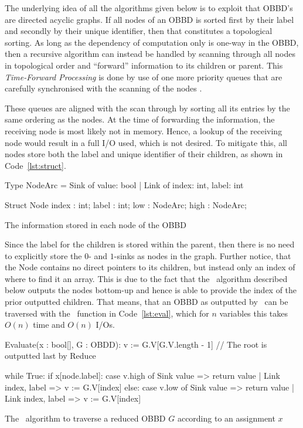 The underlying idea of all the algorithms given below is to exploit that OBBD's
are directed acyclic graphs. If all nodes of an OBBD is sorted first by their
label and secondly by their unique identifier, then that constitutes a
topological sorting. As long as the dependency of computation only is one-way in
the OBBD, then a recursive algorithm can instead be handled by scanning through
all nodes in topological order and ``forward'' information to its children or
parent. This \emph{Time-Forward Processing} is done by use of one more priority
queues that are carefully synchronised with the scanning of the nodes \todocite.

These queues are aligned with the scan through by sorting all its entries by the
same ordering as the nodes. At the time of forwarding the information, the
receiving node is most likely not in memory. Hence, a lookup of the receiving
node would result in a full I/O used, which is not desired. To mitigate this,
all nodes store both the label and unique identifier of their children, as shown
in Code~\ref{lst:struct}.
\begin{lstfloat}[ht!]
  \centering

  \begin{blstlisting}[language=pseudo, numbers=none]
  Type NodeArc = Sink of { value: bool }
               | Link of { index: int, label: int }

  Struct Node {
    index : int;
    label : int;
    low   : NodeArc;
    high  : NodeArc;
  }
  \end{blstlisting}

  \caption{The information stored in each node of the OBBD}
  \label{lst:struct}
\end{lstfloat}

Since the label for the children is stored within the parent, then there is no
need to explicitly store the $0$- and $1$-sinks as nodes in the graph. Further
notice, that the Node contains no direct pointers to its children, but instead
only an index of where to find it an array. This is due to the fact that the
\Reduce\ algorithm described below outputs the nodes bottom-up and hence is able
to provide the index of the prior outputted children. That means, that an OBBD
as outputted by \Reduce\ can be traversed with the \Evaluate\ function in
Code~\ref{lst:eval}, which for $n$ variables this takes $O(n)$ time and $O(n)$
I/Os.
\begin{lstfloat}[ht!]
  \centering

  \begin{blstlisting}
  Evaluate(x : bool[], G : OBDD):
    v := G.V[G.V.length - 1] // The root is outputted last by Reduce

    while True:
      if x[node.label]:
        case v.high of Sink{ value }        => return value
                     | Link{ index, label } => v := G.V[index]
      else:
        case v.low of Sink{ value }         => return value
                    | Link{ index, label }  => v := G.V[index]
  \end{blstlisting}

  \caption{The \Evaluate\ algorithm to traverse a reduced OBBD $G$ according to an
    assignment $x$}
  \label{lst:eval}
\end{lstfloat}

